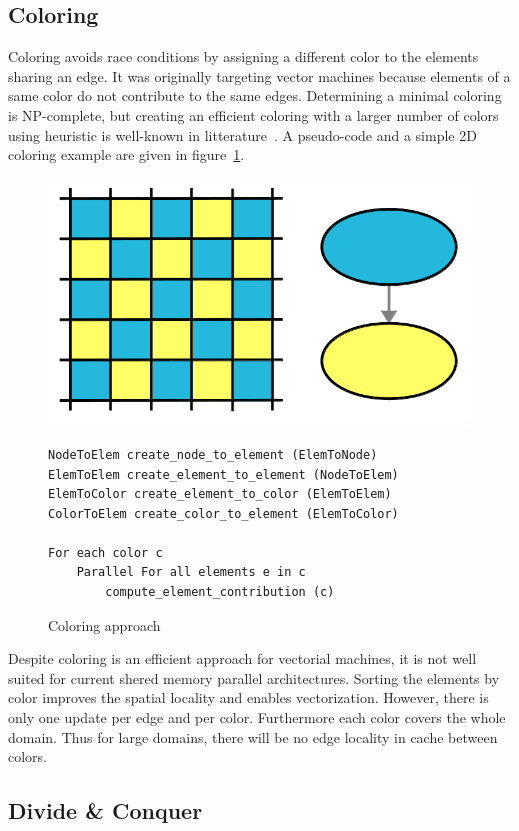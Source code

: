 \documentclass{IOS-Book-Article}
\begin{document}
\subsection{Coloring}
\label{sec:col}
Coloring avoids race conditions by assigning a different color to the elements sharing an edge.
It was originally targeting vector machines because elements of a same color do not contribute to the same edges.
Determining a minimal coloring is NP-complete, but creating an efficient coloring with a larger number of colors using heuristic is well-known in litterature~\cite{findsomeonetocite}.
A pseudo-code and a simple 2D coloring example are given in figure~\ref{fig:colApp}.
\begin{figure}[htp]
 \includegraphics[scale=0.2]{Coloring_approach.png}
 \small
 \begin{verbatim}
NodeToElem create_node_to_element (ElemToNode)
ElemToElem create_element_to_element (NodeToElem)
ElemToColor create_element_to_color (ElemToElem)
ColorToElem create_color_to_element (ElemToColor)

For each color c
    Parallel For all elements e in c
        compute_element_contribution (c)
 \end{verbatim}
 \caption{Coloring approach}
 \label{fig:colApp}
\end{figure}

Despite coloring is an efficient approach for vectorial machines, it is not well suited for current shered memory parallel architectures.
Sorting the elements by color improves the spatial locality and enables vectorization.
However, there is only one update per edge and per color. Furthermore each color covers the whole domain.
Thus for large domains, there will be no edge locality in cache between colors.

\subsection{Divide \& Conquer}
\end{document}
